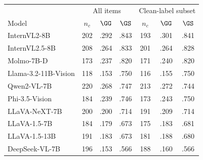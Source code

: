 \begin{tabular}{@{}lcccccc@{}}
\toprule
 & \multicolumn{3}{c}{All items} & \multicolumn{3}{c}{Clean-label subset} \\
Model & $n_c$ & $\GG$ & $\GS$ & $n_c$ & $\GG$ & $\GS$ \\
\midrule
InternVL2-8B & 202 & .292 & .843 & 193 & .301 & .841 \\
InternVL2.5-8B & 208 & .264 & .833 & 201 & .264 & .828 \\
Molmo-7B-D & 173 & .237 & .820 & 171 & .240 & .820 \\
Llama-3.2-11B-Vision & 118 & .153 & .750 & 116 & .155 & .750 \\
Qwen2-VL-7B & 220 & .268 & .747 & 213 & .272 & .744 \\
Phi-3.5-Vision & 184 & .239 & .746 & 173 & .243 & .750 \\
LLaVA-NeXT-7B & 200 & .200 & .714 & 191 & .209 & .714 \\
LLaVA-1.5-7B & 184 & .179 & .673 & 175 & .183 & .681 \\
LLaVA-1.5-13B & 191 & .183 & .673 & 181 & .188 & .680 \\
DeepSeek-VL-7B & 196 & .153 & .566 & 188 & .160 & .566 \\
\bottomrule
\end{tabular}
